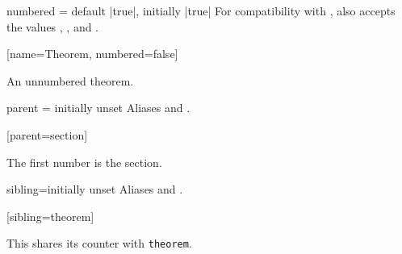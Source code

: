 \documentclass{ltxdoc}
\begin{document}
\begin{docKey}{numbered}
  {=\textbar{}\textbar {}}
  {default |true|, initially |true|}
For compatibility with , also accepts the values , , and .

\begin{tcbwritetemp}
[name=Theorem, numbered=false]
\end{tcbwritetemp}

\begin{keythmscode}[withpreamble]
\begin{theorem*}
An unnumbered theorem.
\end{theorem*}
\end{keythmscode}

\end{docKey}

\begin{docKey}{parent}
  {=}
  {initially unset}
Aliases  and .

\begin{tcbwritetemp}
[parent=section]
\end{tcbwritetemp}

\begin{keythmscode}[withpreamble]
\begin{conjecture}
The first number is the section.
\end{conjecture}
\end{keythmscode}

\end{docKey}

\begin{docKey}{sibling}{=}{initially unset}
Aliases  and .

\begin{tcbwritetemp}
[sibling=theorem]
\end{tcbwritetemp}

\begin{keythmscode}[withpreamble]
\begin{lemma}
This shares its counter with \texttt{theorem}.
\end{lemma}
\end{keythmscode}

\end{docKey}
\end{document}
